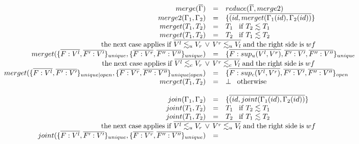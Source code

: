 \documentclass[10pt]{sigplanconf}
\newcommand{\env}{\Gamma}
\begin{document}
\begin{figure*}
{\footnotesize
\[
\begin{array}{rcl}
	merge(\overline{\env}) & = & reduce(\overline{\env}, merge2)\\
	merge2(\env_1,\env_2) & = & \{\overline{(id,merget(\env_1(id),\env_2(id))}\}\\
	merget(T_1, T_2) & = & T_1 \;\;\; \mathrm{if\;} T_2 \lesssim T_1\\
	merget(T_1, T_2) & = & T_2 \;\;\; \mathrm{if\;} T_1 \lesssim T_2\\
	\multicolumn{3}{c}{\;\;\;\;\;\;\;\;\;\;\;\;\;\;\;\;\;\;\;\;\;\;\;\;\;\;\;\;\;\mathrm{the\;next\;case\;applies\;if}\;
		\overline{V^l \lesssim_u V_r \,\vee\, V^r \lesssim_u V_l}\;\mathrm{and\;the\;right\; side\; is\;}wf}\\
	merget(\{\overline{F:V^l},\overline{F^{\prime}:V^\prime}\}_{unique},
	\{\overline{F:V^r},\overline{F^{\prime\prime}:V^{\prime\prime}}\}_{unique}) &=&
	\{\overline{F:sup_u(V^l,V^r)},\overline{F^\prime:V^\prime},\overline{F^{\prime\prime}:V^{\prime\prime}}\}_{unique}
	\\
	\multicolumn{3}{c}{\;\;\;\;\;\;\;\;\;\;\;\;\;\;\;\;\;\;\;\;\;\;\;\;\;\;\;\;\;\mathrm{the\;next\;case\;applies\;if}\;
		\overline{V^l \lesssim_c V_r \,\vee\, V^r \lesssim_c V_l}\;\mathrm{and\;the\;right\; side\; is\;}wf}\\
	merget(\{\overline{F:V^l},\overline{F^{\prime}:V^{\prime}}\}_{unique|open},
	\{\overline{F:V^r},\overline{F^{\prime\prime}:V^{\prime\prime}}\}_{unique|open}) &=&
	\{\overline{F:sup_c(V^l,V^r)},\overline{F^\prime:V^\prime},\overline{F^{\prime\prime}:V^{\prime\prime}}\}_{open}
	\\
	merget(T_1, T_2) & = & \bot \;\;\; \mathrm{otherwise}\\\\
	join(\env_1,\env_2) & = & \{\overline{(id,joint(\env_1(id),\env_2(id))}\}\\
	joint(T_1, T_2) & = & T_1 \;\;\; \mathrm{if\;} T_2 \lesssim T_1\\
	joint(T_1, T_2) & = & T_2 \;\;\; \mathrm{if\;} T_1 \lesssim T_2\\
	\multicolumn{3}{c}{\;\;\;\;\;\;\;\;\;\;\;\;\;\;\;\;\;\;\;\;\;\;\;\;\;\;\;\;\;\mathrm{the\;next\;case\;applies\;if}\;
		\overline{V^l \lesssim_u V_r \,\vee\, V^r \lesssim_u V_l}\;\mathrm{and\;the\;right\; side\; is\;}wf}\\
	joint(\{\overline{F:V^l},\overline{F^{\prime}:V^{\prime}}\}_{unique},
	\{\overline{F:V^r},\overline{F^{\prime\prime}:V^{\prime\prime}}\}_{unique}) &=&

\end{array}\]}
\end{figure*}
\end{document}
